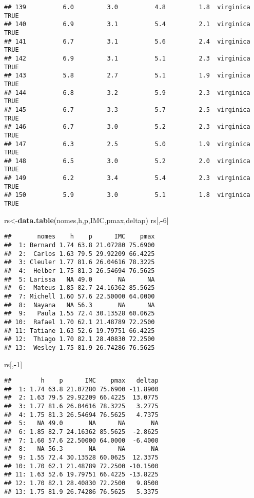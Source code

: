 \documentclass[]{article}
\newenvironment{Shaded}{\begin{snugshade}}{\end{snugshade}}
\newcommand{\KeywordTok}[1]{\textcolor[rgb]{0.13,0.29,0.53}{\textbf{#1}}}
\newcommand{\DecValTok}[1]{\textcolor[rgb]{0.00,0.00,0.81}{#1}}
\newcommand{\OperatorTok}[1]{\textcolor[rgb]{0.81,0.36,0.00}{\textbf{#1}}}
\newcommand{\NormalTok}[1]{#1}
\begin{document}
\begin{verbatim}
## 139          6.0         3.0          4.8         1.8  virginica   TRUE
## 140          6.9         3.1          5.4         2.1  virginica   TRUE
## 141          6.7         3.1          5.6         2.4  virginica   TRUE
## 142          6.9         3.1          5.1         2.3  virginica   TRUE
## 143          5.8         2.7          5.1         1.9  virginica   TRUE
## 144          6.8         3.2          5.9         2.3  virginica   TRUE
## 145          6.7         3.3          5.7         2.5  virginica   TRUE
## 146          6.7         3.0          5.2         2.3  virginica   TRUE
## 147          6.3         2.5          5.0         1.9  virginica   TRUE
## 148          6.5         3.0          5.2         2.0  virginica   TRUE
## 149          6.2         3.4          5.4         2.3  virginica   TRUE
## 150          5.9         3.0          5.1         1.8  virginica   TRUE
\end{verbatim}

\begin{Shaded}
\begin{Highlighting}[]
\NormalTok{rs<-}\KeywordTok{data.table}\NormalTok{(nomes,h,p,IMC,pmax,deltap)}
\NormalTok{rs[,}\OperatorTok{-}\DecValTok{6}\NormalTok{]}
\end{Highlighting}
\end{Shaded}

\begin{verbatim}
##       nomes    h    p      IMC    pmax
##  1: Bernard 1.74 63.8 21.07280 75.6900
##  2:  Carlos 1.63 79.5 29.92209 66.4225
##  3: Cleuler 1.77 81.6 26.04616 78.3225
##  4:  Helber 1.75 81.3 26.54694 76.5625
##  5: Larissa   NA 49.0       NA      NA
##  6:  Mateus 1.85 82.7 24.16362 85.5625
##  7: Michell 1.60 57.6 22.50000 64.0000
##  8:  Nayana   NA 56.3       NA      NA
##  9:   Paula 1.55 72.4 30.13528 60.0625
## 10:  Rafael 1.70 62.1 21.48789 72.2500
## 11: Tatiane 1.63 52.6 19.79751 66.4225
## 12:  Thiago 1.70 82.1 28.40830 72.2500
## 13:  Wesley 1.75 81.9 26.74286 76.5625
\end{verbatim}

\begin{Shaded}
\begin{Highlighting}[]
\NormalTok{rs[,}\OperatorTok{-}\DecValTok{1}\NormalTok{]}
\end{Highlighting}
\end{Shaded}

\begin{verbatim}
##        h    p      IMC    pmax   deltap
##  1: 1.74 63.8 21.07280 75.6900 -11.8900
##  2: 1.63 79.5 29.92209 66.4225  13.0775
##  3: 1.77 81.6 26.04616 78.3225   3.2775
##  4: 1.75 81.3 26.54694 76.5625   4.7375
##  5:   NA 49.0       NA      NA       NA
##  6: 1.85 82.7 24.16362 85.5625  -2.8625
##  7: 1.60 57.6 22.50000 64.0000  -6.4000
##  8:   NA 56.3       NA      NA       NA
##  9: 1.55 72.4 30.13528 60.0625  12.3375
## 10: 1.70 62.1 21.48789 72.2500 -10.1500
## 11: 1.63 52.6 19.79751 66.4225 -13.8225
## 12: 1.70 82.1 28.40830 72.2500   9.8500
## 13: 1.75 81.9 26.74286 76.5625   5.3375
\end{verbatim}
\end{document}
